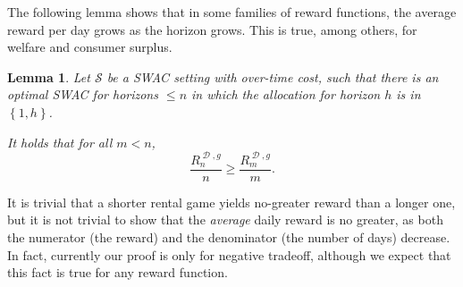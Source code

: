 \documentclass[11pt,letterpaper]{article}
\newcommand{\set}[1]{\left\{#1\right\}}
\newcommand{\Bnote}[1]{ {\color{cyan} Batya: #1}}
\newcommand{\swac}{SWAC\xspace}
\DeclareMathOperator{\D}{\mathcal{D}}
\renewcommand{\S}{\mathcal{S}}
\newcommand{\g}{g}
\theoremstyle{plain}
\newtheorem{lemma}[theorem]{Lemma}
\begin{document}
The following lemma shows that in some families of reward functions, the average reward per day grows as the horizon grows. This is true, among others, for welfare and consumer surplus.
\begin{lemma}\label{lemma:avg_reward_increase_with_horizon}
    Let  $\S$ be a \swac setting with over-time cost, such that there is an optimal \swac for horizons $\leq n$ in which the allocation for horizon $h$ is in $\set{1,h}$. 

    It holds that for all $m<n$,
    \begin{equation*}
        \frac{R_n^{\D,\g}}{n}\geq\frac{R_m^{\D,\g}}{m}.
    \end{equation*}
\end{lemma}
It is trivial that a shorter rental game yields no-greater reward than a longer one, but it is not trivial to show that the \emph{average} daily reward is no greater, as both the numerator (the reward) and the denominator (the number of days) decrease.
In fact, currently our proof is only for negative tradeoff,
although we expect that this fact is true for any reward function.
\end{document}
